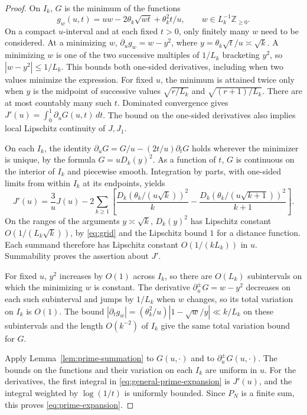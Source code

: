 \documentclass[11pt]{amsart}
\theoremstyle{remark}
\newcommand{\Z}{\mathbb Z}
\begin{document}
\begin{proof}
On \(I_k\), \(G\) is the minimum of the functions
\[
 g_w(u,t)=uw-2\theta_k\sqrt{wt}+\theta_k^2 t/u,\qquad
 w\in L_k^{-1}\Z_{\ge0}.
\]
On a compact \(u\)-interval and at each fixed \(t>0\), only finitely many \(w\) need to be considered. At a minimizing \(w\), \(\partial_u g_w=w-y^2\), where \(y=\theta_k\sqrt t/u\asymp\sqrt k\). A minimizing \(w\) is one of the two successive multiples of \(1/L_k\)
bracketing \(y^2\), so \(|w-y^2|\le1/L_k\). This bounds both one-sided
derivatives, including when two values minimize the expression. For fixed \(u\), the minimum is attained twice only when \(y\) is the midpoint of successive values \(\sqrt{r/L_k}\) and \(\sqrt{(r+1)/L_k}\). There are at most countably many such \(t\). Dominated convergence gives \(J'(u)=\int_0^1\partial_u G(u,t)\,dt\). The bound on the one-sided derivatives also implies local Lipschitz continuity of \(J,J_1\).

On each \(I_k\), the identity
\(\partial_u G=G/u-(2t/u)\partial_tG\) holds wherever the minimizer is unique, by the formula \(G=uD_k(y)^2\). As a function of \(t\), \(G\) is continuous on the interior of \(I_k\) and piecewise smooth. Integration by parts, with one-sided limits from within \(I_k\) at its endpoints, yields
\[
 J'(u)=\frac{3}{u}J(u)
 -2\sum_{k\ge1}\left[
 \frac{D_k(\theta_k/(u\sqrt k))^2}{k}
 -\frac{D_k(\theta_k/(u\sqrt{k+1}))^2}{k+1}\right].
\]
On the ranges of the arguments \(y\asymp\sqrt k\), \(D_k(y)^2\) has Lipschitz constant \(O(1/(L_k\sqrt k))\), by \eqref{eq:grid} and the Lipschitz bound \(1\) for a distance function. Each summand therefore has Lipschitz constant \(O(1/(kL_k))\) in \(u\). Summability proves the assertion about \(J'\).

For fixed \(u\), \(y^2\) increases by \(O(1)\) across \(I_k\), so there are \(O(L_k)\) subintervals on which the minimizing \(w\) is constant. The derivative \(\partial_u^\pm G=w-y^2\) decreases on each such subinterval and jumps by \(1/L_k\) when \(w\) changes, so its total variation on \(I_k\) is \(O(1)\). The bound \(|\partial_t g_w|=(\theta_k^2/u)|1-\sqrt w/y|\ll k/L_k\) on these subintervals and the length \(O(k^{-2})\) of \(I_k\) give the same total variation bound for \(G\).

Apply Lemma~\ref{lem:prime-summation} to \(G(u,\cdot)\) and to
\(\partial_u^\pm G(u,\cdot)\). The bounds on the functions and their
variation on each \(I_k\) are uniform in \(u\). For the derivatives,
the first integral in \eqref{eq:general-prime-expansion} is \(J'(u)\),
and the integral weighted by \(\log(1/t)\) is uniformly bounded.
Since \(P_N\) is a finite sum, this proves \eqref{eq:prime-expansion}.
\end{proof}
\end{document}
